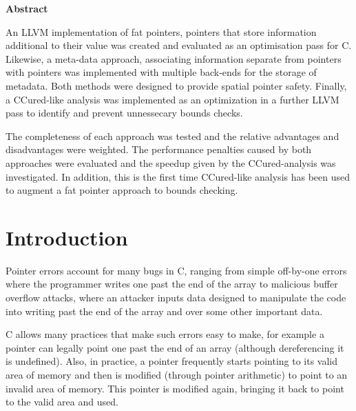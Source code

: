 \documentclass[a4paper,12pt,twoside,openright]{report}
\begin{document}
\pagestyle{empty}
\singlespacing

\onehalfspacing

\singlespacing
\newpage
{\Huge \bf Abstract}
\vspace{24pt} 

An LLVM implementation of fat pointers, pointers that store information additional to their value was created and evaluated as an optimisation pass for C.
Likewise, a meta-data approach, associating information separate from pointers with pointers was implemented with multiple back-ends for the storage of metadata.
Both methods were designed to provide spatial pointer safety.
Finally, a CCured-like analysis was implemented as an optimization in a further LLVM pass to identify and prevent unnessecary bounds checks.

The completeness of each approach was tested and the relative advantages and disadvantages were weighted.
The performance penalties caused by both approaches were evaluated and the speedup given by the CCured-analysis was investigated.
In addition, this is the first time CCured-like analysis has been used to augment a fat pointer approach to bounds checking.

\newpage
\vspace*{\fill}

\setcounter{page}{0}
\pagestyle{plain}
\tableofcontents
\listoffigures
\listoftables

\onehalfspacing


\chapter{Introduction}
\setcounter{page}{1} 

Pointer errors account for many bugs in C, ranging from simple off-by-one errors where the programmer writes one past the end of the array to malicious buffer overflow attacks, where an attacker inputs data designed to manipulate the code into writing past the end of the array and over some other important data.

C allows many practices that make such errors easy to make, for example a pointer can legally point one past the end of an array (although dereferencing it is undefined).
Also, in practice, a pointer frequently starts pointing to its valid area of memory and then is modified (through pointer arithmetic) to point to an invalid area of memory.
This pointer is modified again, bringing it back to point to the valid area and used.
\end{document}
